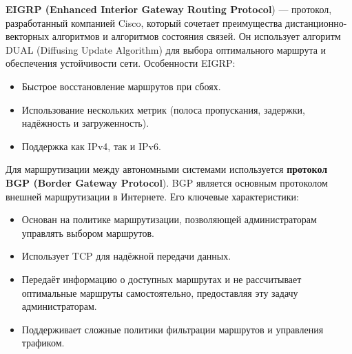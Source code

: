 \documentclass[a4paper, 12pt]{report}
\numberwithin{equation}{section}
\begin{document}
\begin{itemize}
\begin{itemize}
	\end{itemize}
	\textbf{EIGRP (Enhanced Interior Gateway Routing Protocol}) — протокол, разработанный компанией Cisco, который сочетает преимущества дистанционно-векторных алгоритмов и алгоритмов состояния связей. Он использует алгоритм DUAL ({Diffusing Update Algorithm}) для выбора оптимального маршрута и обеспечения устойчивости сети. Особенности EIGRP:
	\begin{itemize}
		\item Быстрое восстановление маршрутов при сбоях.
		\item Использование нескольких метрик (полоса пропускания, задержки, надёжность и загруженность).
		\item Поддержка как IPv4, так и IPv6.
	\end{itemize}
\end{itemize}
Для маршрутизации между автономными системами используется \textbf{протокол BGP (Border Gateway Protocol}). BGP является основным протоколом внешней маршрутизации в Интернете. Его ключевые характеристики:
\begin{itemize}
	\item Основан на политике маршрутизации, позволяющей администраторам управлять выбором маршрутов.
	\item Использует TCP для надёжной передачи данных.
	\item Передаёт информацию о доступных маршрутах и не рассчитывает оптимальные маршруты самостоятельно, предоставляя эту задачу администраторам.
	\item Поддерживает сложные политики фильтрации маршрутов и управления трафиком.
\end{itemize}
\end{document}
